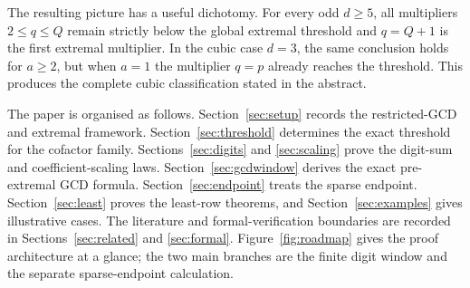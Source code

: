 \documentclass[11pt]{article}
\theoremstyle{definition}
\theoremstyle{remark}
\begin{document}
The resulting picture has a useful dichotomy.  For every odd \(d\ge5\), all
multipliers \(2\le q\le Q\) remain strictly below the global extremal threshold
and \(q=Q+1\) is the first extremal multiplier.  In the cubic case \(d=3\),
the same conclusion holds for \(a\ge2\), but when \(a=1\) the multiplier
\(q=p\) already reaches the threshold.  This produces the complete cubic
classification stated in the abstract.

The paper is organised as follows.  Section~\ref{sec:setup} records the
restricted-GCD and extremal framework.  Section~\ref{sec:threshold} determines
the exact threshold for the cofactor family.  Sections~\ref{sec:digits} and
\ref{sec:scaling} prove the digit-sum and coefficient-scaling laws.
Section~\ref{sec:gcdwindow} derives the exact pre-extremal GCD formula.
Section~\ref{sec:endpoint} treats the sparse endpoint.
Section~\ref{sec:least} proves the least-row theorems, and
Section~\ref{sec:examples} gives illustrative cases.  The literature and
formal-verification boundaries are recorded in
Sections~\ref{sec:related} and \ref{sec:formal}.
Figure~\ref{fig:roadmap} gives the proof architecture at a glance; the two
main branches are the finite digit window and the separate sparse-endpoint
calculation.
\end{document}
